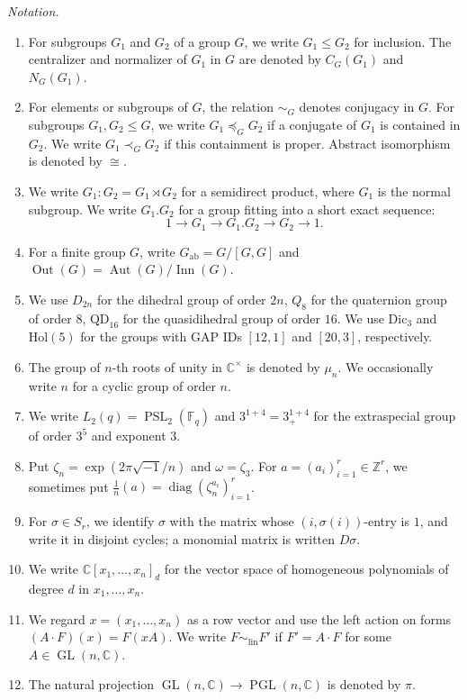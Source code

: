 \documentclass[12pt]{amsart}
\numberwithin{equation}{section}
\theoremstyle{plain}
\theoremstyle{definition}
\theoremstyle{remark}
\newcommand{\CC}{\mathbb C}
\newcommand{\ZZ}{\mathbb Z}
\newcommand{\FF}{\mathbb F}
\DeclareMathOperator{\GL}{GL}
\DeclareMathOperator{\PGL}{PGL}
\DeclareMathOperator{\PSL}{PSL}
\DeclareMathOperator{\diag}{diag}
\begin{document}
\medskip
\noindent\emph{Notation.}
\begin{enumerate}
\item For subgroups $G_1$ and $G_2$ of a group $G$, we write
$G_1\leq G_2$ for inclusion. The centralizer and normalizer of $G_1$
in $G$ are denoted by $C_G(G_1)$ and $N_G(G_1)$.
\item For elements or subgroups of $G$, the relation $\sim_G$ denotes
conjugacy in $G$. For subgroups $G_1,G_2\leq G$, we write
$G_1\preceq_G G_2$ if a conjugate of $G_1$ is contained in $G_2$.
We write $G_1\prec_G G_2$ if this containment is proper. Abstract
isomorphism is denoted by $\cong$.
\item We write $G_1:G_2=G_1\rtimes G_2$ for a semidirect product, where $G_1$ is the normal subgroup. We write $G_1.G_2$ for a group fitting into a short exact sequence:
\[1\longrightarrow G_1\longrightarrow G_1.G_2\longrightarrow G_2\longrightarrow 1. \]
\item For a finite group $G$, write
$G_{\mathrm{ab}}=G/[G,G]$ and
$\operatorname{Out}(G)=\operatorname{Aut}(G)/\operatorname{Inn}(G)$.
\item We use $D_{2n}$ for the dihedral group of order $2n$, $Q_8$ for the
quaternion group of order $8$, $\mathrm{QD}_{16}$ for the quasidihedral
group of order $16$. We use $\mathrm{Dic}_3$ and $\mathrm{Hol}(5)$ for the groups
with GAP IDs $[12,1]$ and $[20,3]$, respectively.

\item The group of $n$-th roots of unity in $\CC^\times$ is denoted by $\mu_n$.  We occasionally write $n$ for a cyclic group of order $n$.
\item We write $L_2(q)=\PSL_2(\FF_q)$ and $3^{1+4}=3^{1+4}_+$ for the extraspecial group of order $3^5$ and exponent $3$.
\item Put $\zeta_n=\exp(2\pi\sqrt{-1}/n)$ and $\omega=\zeta_3$. For
$a=(a_i)_{i=1}^r\in\ZZ^r$, we sometimes put
$\frac1n(a)=\diag(\zeta_n^{a_i})_{i=1}^r$.
\item For $\sigma\in S_r$, we identify $\sigma$ with
the matrix whose $(i,\sigma(i))$-entry is $1$, and write it in disjoint
cycles; a monomial matrix is written $D\sigma$.
\item We write $\CC[x_1,\ldots,x_n]_d$ for the vector space of homogeneous
polynomials of degree $d$ in $x_1,\ldots,x_n$.
\item We regard $x=(x_1,\ldots,x_n)$ as a row vector and use the left action
on forms
$(A\cdot F)(x)=F(xA)$.  We write $F\sim_{\mathrm{lin}}F'$ if
$F'=A\cdot F$ for some $A\in\GL(n,\CC)$.
\item The natural projection $\GL(n,\CC)\to\PGL(n,\CC)$ is denoted by
$\pi$.
\end{enumerate}
\end{document}
